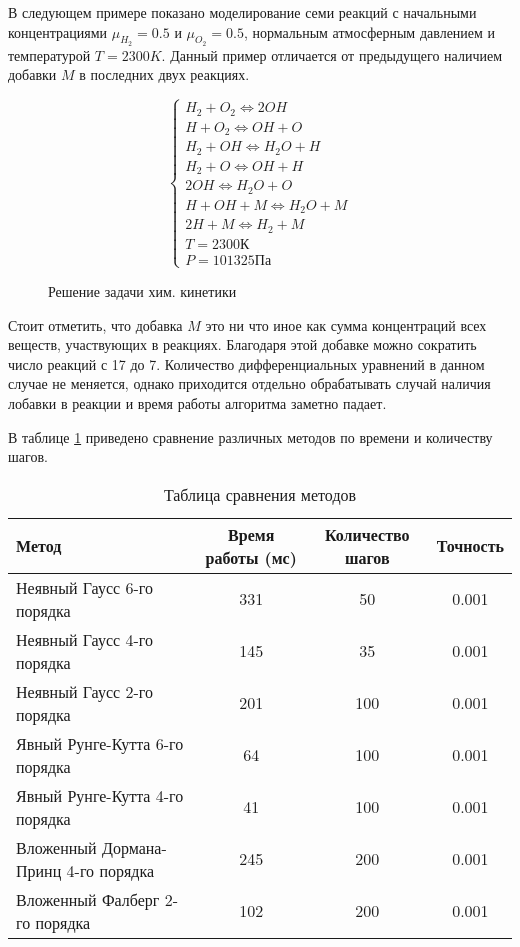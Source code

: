 В следующем примере показано моделирование семи реакций с начальными концентрациями $\mu_{H_2} = 0.5$ и $\mu_{O_2} = 0.5$, нормальным
атмосферным давлением и температурой $T = 2300K$. Данный пример отличается от предыдущего наличием добавки $M$ в последних двух реакциях.

$$
\begin{cases}
    H_2 + O_2 \Longleftrightarrow 2OH\\
    H + O_2 \Longleftrightarrow OH + O\\
    H_2 + OH \Longleftrightarrow H_2O + H\\
    H_2 + O \Longleftrightarrow OH + H\\
    2OH \Longleftrightarrow H_2O + O\\
    H + OH + M \Longleftrightarrow H_2O + M\\
    2H + M \Longleftrightarrow H_2 + M\\
    T = 2300\text{К}\\
    P = 101325\text{Па}
\end{cases}
$$

\begin{figure}
    
    \caption{Решение задачи хим. кинетики}
    \label{fig:chem2}
\end{figure}

Стоит отметить, что добавка $M$ это ни что иное как сумма концентраций всех веществ, участвующих в реакциях. Благодаря этой добавке
можно сократить число реакций с 17 до 7. Количество дифференциальных уравнений в данном случае не меняется, однако приходится
отдельно обрабатывать случай наличия лобавки в реакции и время работы алгоритма заметно падает.

В таблице \ref{tab:Methods2} приведено сравнение различных методов по времени и количеству шагов.

\begin{table}    
    \caption{Таблица сравнения методов}
    \begin{tabularx}{\textwidth}{|X|c|c|c|}
    \hline
    Метод & Время работы (мс) & Количество шагов & Точность\\
    \hline
    Неявный Гаусс 6-го порядка & 331 & 50 & 0.001\\
    \hline
    Неявный Гаусс 4-го порядка & 145 & 35 & 0.001\\
    \hline
    Неявный Гаусс 2-го порядка & 201 & 100 & 0.001\\
    \hline
    Явный Рунге-Кутта 6-го порядка & 64 & 100 & 0.001\\
    \hline
    Явный Рунге-Кутта 4-го порядка & 41 & 100 & 0.001\\
    \hline
    Вложенный Дормана-Принц 4-го порядка & 245 & 200 & 0.001\\
    \hline
    Вложенный Фалберг 2-го порядка & 102 & 200 & 0.001\\
    \hline
    \end{tabularx}
    \label{tab:Methods2}
\end{table}

